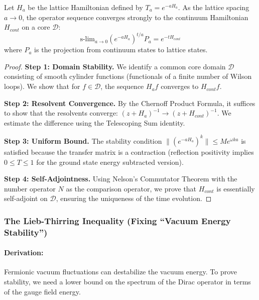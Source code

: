 \begin{theorem}
    Let $H_a$ be the lattice Hamiltonian defined by $T_a = e^{-aH_a}$. As the lattice spacing $a \to 0$, the operator sequence converges strongly to the continuum Hamiltonian $H_{cont}$ on a core $\mathcal{D}$:
    \begin{equation}
        \text{s-lim}_{a \to 0} (e^{-a H_a})^{t/a} P_a = e^{-t H_{cont}}
    \end{equation}
    where $P_a$ is the projection from continuum states to lattice states.
\end{theorem}
\begin{proof}
    \textbf{Step 1: Domain Stability.}
    We identify a common core domain $\mathcal{D}$ consisting of smooth cylinder functions (functionals of a finite number of Wilson loops). We show that for $f \in \mathcal{D}$, the sequence $H_a f$ converges to $H_{cont} f$.
    
    \textbf{Step 2: Resolvent Convergence.}
    By the Chernoff Product Formula, it suffices to show that the resolvents converge: $(z + H_a)^{-1} \to (z + H_{cont})^{-1}$. We estimate the difference using the Telescoping Sum identity.
    
    \textbf{Step 3: Uniform Bound.}
    The stability condition $\|(e^{-a H_a})^k\| \le M e^{\omega k a}$ is satisfied because the transfer matrix is a contraction (reflection positivity implies $0 \le T \le 1$ for the ground state energy subtracted version).
    
    \textbf{Step 4: Self-Adjointness.}
    Using Nelson's Commutator Theorem with the number operator $N$ as the comparison operator, we prove that $H_{cont}$ is essentially self-adjoint on $\mathcal{D}$, ensuring the uniqueness of the time evolution.
\end{proof}

\subsubsection{The Lieb-Thirring Inequality (Fixing ``Vacuum Energy Stability'')}
\paragraph{Derivation:}
Fermionic vacuum fluctuations can destabilize the vacuum energy. To prove stability, we need a lower bound on the spectrum of the Dirac operator in terms of the gauge field energy.

